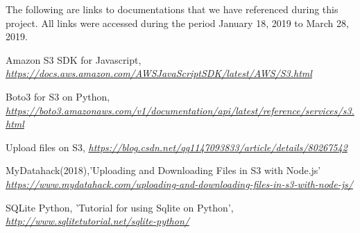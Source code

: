 \newline 
The following are links to documentations that we have referenced during this project. All links were accessed during the period January 18, 2019 to March 28, 2019.

\begin{thebibliography}{9}

Amazon S3 SDK for Javascript,
\textit{\url{https://docs.aws.amazon.com/AWSJavaScriptSDK/latest/AWS/S3.html}}

Boto3 for S3 on Python,
\textit{\url{https://boto3.amazonaws.com/v1/documentation/api/latest/reference/services/s3.html}}

Upload files on S3,
\textit{\url{https://blog.csdn.net/qq1147093833/article/details/80267542}}

MyDatahack(2018),'Uploading and Downloading Files in S3 with Node.js'
\textit{\url{https://www.mydatahack.com/uploading-and-downloading-files-in-s3-with-node-js/}}

SQLite Python, 'Tutorial for using Sqlite on Python',
\textit{\url{http://www.sqlitetutorial.net/sqlite-python/}}


\end{thebibliography}